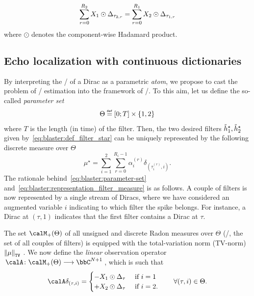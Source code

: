 \begin{equation}
    \label{eq:blaster:cross-relation-approx}
    \sum_{r=0}^{R_2}X_1 \odot \Delta_{\tau_{2,r}}
    =
    \sum_{r=0}^{R_1}X_2 \odot \Delta_{\tau_{1,r}}
\end{equation}
where $\odot$ denotes the component-wise Hadamard product.

\subsection{Echo localization with continuous dictionaries}
By interpreting the \FT/ of a Dirac as a parametric \textit{atom}, we propose to cast the problem of \RIR/ estimation into the framework of \CDdef/.
To this aim, let us define the so-called \emph{parameter set}
\begin{equation}
    \label{eq:blaster:parameter-set}
    \Theta \eqdef \kintervcc{0}{T} \times \kbrace{1, 2}
\end{equation}
where $T$ is the length (in time) of the filter.
Then, the two desired filters  $\tilde{h}_1^\star,\tilde{h}_2^\star$ given by~\cref{eq:blaster:def_filter_star} can be uniquely represented by the following discrete measure over $\Theta$
\begin{equation}
    \label{eq:blaster:representation_filter_measure}
    \mu^\star = \sum_{i=1}^{2} \sum_{r=0}^{R_{i}-1} \alpha_{i}^{(r)} \delta_{(\tau_{i}^{(r)}, i)}.
\end{equation}
The rationale behind~\cref{eq:blaster:parameter-set}  and~\cref{eq:blaster:representation_filter_measure} is as follows.
A couple of filters is now represented by a single stream of Diracs, where we have considered an augmented variable $i$ indicating to which filter the spike belongs.
For instance, a Dirac at $(\tau, 1)$ indicates that the first filter contains a Dirac at $\tau$.

\mynewline
The set $\posDisRadonMeasure$ of all unsigned and discrete Radon measures over $\Theta$ (\ie/, the set of all couples of  filters) is equipped with the total-variation norm (TV-norm) $\normTV{\mu}$
.
We now define the \emph{linear} observation operator $\kfuncdef{\opObs}{\posDisRadonMeasure}{\bbC^{N+1}}$, which is such that
\begin{equation}
    \opObs\delta_{(\tau, i)}
    =
    \begin{cases}
        - \RecordedSignalDFT_1 \odot \paramVec{\tau}  &\text{ if } i=1 \\
        + \RecordedSignalDFT_2 \odot \paramVec{\tau}  &\text{ if } i=2.
    \end{cases}
    \qquad \forall(\tau,i)\in\Theta.
\end{equation}

